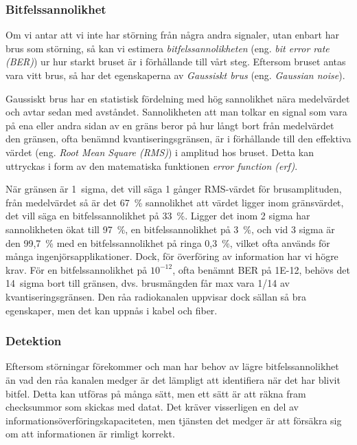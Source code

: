 \subsubsection{Bitfelssannolikhet}

Om vi antar att vi inte har störning från några andra signaler, utan enbart har
brus som störning, så kan vi estimera \emph{bitfelssannolikheten} (eng.
\emph{bit error rate (BER)}) ur hur starkt bruset är i förhållande till vårt
steg. Eftersom bruset antas vara vitt brus, så har det egenskaperna av
\emph{Gaussiskt brus} (eng. \emph{Gaussian noise}).

Gaussiskt brus har en statistisk fördelning med hög sannolikhet nära
medelvärdet och avtar sedan med avståndet. Sannolikheten att man tolkar en
signal som vara på ena eller andra sidan av en gräns beror på hur långt bort
från medelvärdet den gränsen, ofta benämnd kvantiseringsgränsen, är i
förhållande till den effektiva värdet (eng. \emph{Root Mean Square (RMS)}) i
amplitud hos bruset. Detta kan uttryckas i form av den matematiska funktionen
\emph{error function (erf)}.

När gränsen är 1~sigma, det vill säga 1 gånger RMS-värdet för brusamplituden,
från medelvärdet så är det 67~\% sannolikhet att värdet ligger inom
gränsvärdet, det vill säga en bitfelssannolikhet på 33~\%.
Ligger det inom 2 sigma har sannolikheten ökat till 97~\%, en
bitfelssannolikhet på 3~\%, och vid 3 sigma är den 99,7~\% med en
bitfelssannolikhet på ringa 0,3~\%, vilket ofta används för många
ingenjörsapplikationer. Dock, för överföring av information har vi högre krav.
För en bitfelssannolikhet på \(10^{-12}\), ofta benämnt BER på 1E-12, behövs
det 14~sigma bort till gränsen, dvs. brusmängden får max vara 1/14 av
kvantiseringsgränsen. Den råa radiokanalen uppvisar dock sällan så bra
egenskaper, men det kan uppnås i kabel och fiber.

\subsubsection{Detektion}
\label{bitfel_detektion}

Eftersom störningar förekommer och man har behov av lägre bitfelssannolikhet
än vad den råa kanalen medger är det lämpligt att identifiera när det har
blivit bitfel. Detta kan utföras på många sätt, men ett sätt är att räkna fram
checksummor som skickas med datat. Det kräver visserligen en del av
informationsöverföringskapaciteten, men tjänsten det medger är att försäkra sig
om att informationen är rimligt korrekt.

